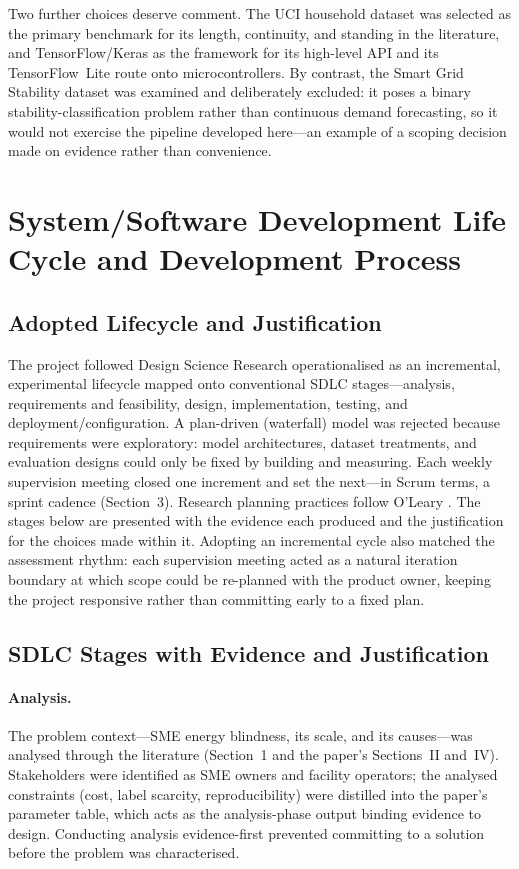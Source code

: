 \documentclass[11pt,a4paper]{article}
\begin{document}
Two further choices deserve comment. The UCI household dataset
\cite{hebrail2012individual} was selected as the primary benchmark for its
length, continuity, and standing in the literature, and TensorFlow/Keras
\cite{abadi2016tensorflow} as the framework for its high-level API and its
TensorFlow~Lite route onto microcontrollers. By contrast, the Smart Grid
Stability dataset \cite{arzamasov2018towards} was examined and deliberately
excluded: it poses a binary stability-classification problem rather than
continuous demand forecasting, so it would not exercise the pipeline developed
here---an example of a scoping decision made on evidence rather than
convenience.


\section{System/Software Development Life Cycle and Development Process}

\subsection{Adopted Lifecycle and Justification}
The project followed Design Science Research
\cite{hevner2004design,peffers2007design} operationalised as an incremental,
experimental lifecycle mapped onto conventional SDLC stages---analysis,
requirements and feasibility, design, implementation, testing, and
deployment/configuration. A plan-driven (waterfall) model was rejected because
requirements were exploratory: model architectures, dataset treatments, and
evaluation designs could only be fixed by building and measuring. Each weekly
supervision meeting closed one increment and set the next---in Scrum terms, a
sprint cadence (Section~3). Research planning practices follow O'Leary
\cite{zina2021essential}. The stages below are presented with the evidence each
produced and the justification for the choices made within it. Adopting an incremental cycle also matched the assessment rhythm: each supervision meeting acted as a natural iteration boundary at which scope could be re-planned with the product owner, keeping the project responsive rather than committing early to a fixed plan.

\subsection{SDLC Stages with Evidence and Justification}

\paragraph{Analysis.}
The problem context---SME energy blindness, its scale, and its causes---was
analysed through the literature (Section~1 and the paper's Sections~II and~IV).
Stakeholders were identified as SME owners and facility operators; the analysed
constraints (cost, label scarcity, reproducibility) were distilled into the
paper's parameter table, which acts as the analysis-phase output binding
evidence to design. Conducting analysis evidence-first prevented committing to a
solution before the problem was characterised.
\end{document}
